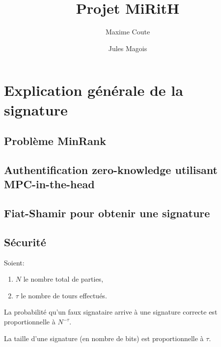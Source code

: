 \documentclass{article}
\title{Projet MiRitH}
\author{Maxime Coute \and Jules Magois}
\begin{document}
\maketitle

\section{Explication générale de la signature}
\subsection{Problème MinRank}
\subsection{Authentification zero-knowledge utilisant MPC-in-the-head}
\subsection{Fiat-Shamir pour obtenir une signature}
\subsection{Sécurité}

Soient:
\begin{enumerate}
  \item \(N\) le nombre total de parties,
  \item \(\tau\) le nombre de tours effectués.
\end{enumerate}

La probabilité qu'un faux signataire arrive à une signature correcte est
proportionnelle à \(N^{-\tau}\).

La taille d'une signature (en nombre de bits) est proportionnelle à  \(\tau\).
\end{document}

